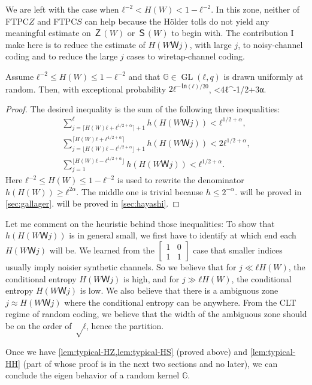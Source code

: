\documentclass[openany]{amsbook}
\numberwithin{equation}{chapter}
\numberwithin{figure}{chapter}
\numberwithin{table}{chapter}
\def\loll{\bsm{1&0\\1&1}}
\DeclareMathOperator\GL{GL}
\def\bsm#1{[\begin{smallmatrix}#1\end{smallmatrix}]}
\def\[#1\]{\begin{equation*}{#1}\end{equation*}}
\theoremstyle{definition}	理dfn:Definition~?s			理exa:Example~?s
\theoremstyle{remark}		理cla:Claim~?s				理rem:Remark~?s
\begin{document}
	We are left with the case when $ℓ^{-2}<H(W)<1-ℓ^{-2}$.
	In this zone, neither of FTPC$Z$ and FTPC$S$ can help because the Hölder tolls
	do not yield any meaningful estimate on $Ｚ(W)$ or $Ｓ(W)$ to begin with.
	The contribution I make here is to reduce the estimate of $H(WＷj)$, with large $j$,
	to noisy-channel coding and to reduce the large $j$ cases to wiretap-channel coding.
	
	\begin{lem}\label{lem:typical-HH}
		Assume $ℓ^{-2}≤H(W)≤1-ℓ^{-2}$ and that
		$𝔾∈\GL(ℓ,q)$ is drawn uniformly at random.
		Then, with exceptional probability $2ℓ^{-㏑(ℓ)/20}$,
		\[÷{h(H(WＷ1))+h(H(WＷ2))+\dotsb+h(H(WＷ{ℓ}))}{ℓh(H(W))}<4ℓ^{-1/2+3α}.\]
	\end{lem}
	
	\begin{proof}
		The desired inequality is the sum of the following three inequalities:
		\begin{gather*}
			∑_{j=⌈H(W)ℓ+ℓ^{1/2+α}⌉+1}^ℓh(H(WＷj))<ℓ^{1/2+α},	\label{ine:bob}\\
			∑_{j=⌊H(W)ℓ-ℓ^{1/2+α}⌋+1}^{⌈H(W)ℓ+ℓ^{1/2+α}⌉}h(H(WＷj))<2ℓ^{1/2+α},	\\
			∑_{j=1}^{⌊H(W)ℓ-ℓ^{1/2+α}⌋}h(H(WＷj))<ℓ^{1/2+α}.	\label{ine:eve}
		\end{gather*}
		Here $ℓ^{-2}≤H(W)≤1-ℓ^{-2}$ is used to rewrite the denominator $h(H(W))≥ℓ^{2α}$.
		The middle one is trivial because $h≤2^{-α}$.
		 will be proved in \cref{sec:gallager}.
		 will be proved in \cref{sec:hayashi}.
	\end{proof}
	
	Let me comment on the heuristic behind those inequalities:
	To show that $h(H(WＷj))$ is in general small, we first
	have to identify at which end each $H(WＷj)$ will be.
	We learned from the $\loll$ case that
	smaller indices usually imply noisier synthetic channels.
	So we believe that for $j≪ℓH(W)$, the conditional entropy $H(WＷj)$ is high,
	and for $j≫ℓH(W)$, the conditional entropy $H(WＷj)$ is low.
	We also believe that there is a ambiguous zone $j≈H(WＷj)$
	where the conditional entropy can be anywhere.
	From the CLT regime of random coding, we believe that the width
	of the ambiguous zone should be on the order of $√ℓ$, hence the partition.
	
	Once we have \cref{lem:typical-HZ,lem:typical-HS} (proved above) and
	\cref{lem:typical-HH} (part of whose proof is in the next two sections
	and no later), we can conclude the eigen behavior of a random kernel $𝔾$.
	
\end{document}
